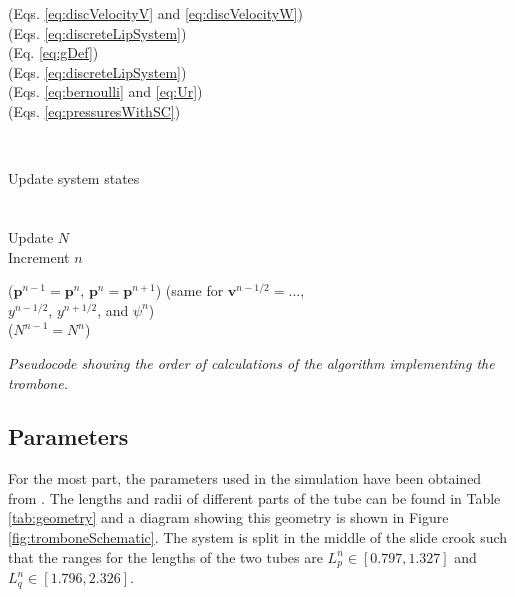 \begin{algorithm}[ht]
{{{\begin{minipage}[c]{0.43\linewidth}
                (Eqs. \eqref{eq:discVelocityV} and \eqref{eq:discVelocityW})\\
                (Eqs. \eqref{eq:discreteLipSystem})\\
                (Eq. \eqref{eq:gDef})\\
                (Eqs. \eqref{eq:discreteLipSystem})\\
                (Eqs. \eqref{eq:bernoulli} and \eqref{eq:Ur})\\
                (Eqs. \eqref{eq:pressuresWithSC})
                \vspace{0.25em}\\
           \end{minipage}
           \\
           \begin{minipage}[c]{0.4\linewidth}
                Update system states\\
                \\
                \\
                Update $N$ \\
                Increment $n$      
            \end{minipage}
            \begin{minipage}[c]{0.5\linewidth}
                ($\mathbf{p}^{n-1} = \mathbf{p}^{n}$, $\mathbf{p}^n=\mathbf{p}^{n+1}$)
                (same for $\mathbf{v}^{n-1/2} = \hdots$,\\
                $y^{n-1/2}$, $y^{n+1/2}$, and $\psi^n$)\\
                ($N^{n-1} = N^n$)\\
            \end{minipage}
            }
        }
    }
    \vspace{0.12cm}
    \caption{\it Pseudocode showing the order of calculations of the algorithm implementing the trombone.\label{alg:calcOrder}}
\end{algorithm}

\subsection{Parameters}
For the most part, the parameters used in the simulation have been obtained from \cite{Harrison2018, Smyth2011, Benade1968}. The lengths and radii of different parts of the tube can be found in Table \ref{tab:geometry} and a diagram showing this geometry is shown in Figure \ref{fig:tromboneSchematic}.
The system is split in the middle of the slide crook such that the ranges for the lengths of the two tubes are $L_p^n \in[0.797, 1.327]$ and $L_q^n \in [1.796, 2.326]$.

